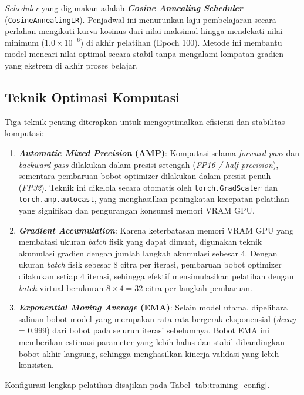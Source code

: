 \documentclass[12pt,a4paper,oneside]{book}
\begin{document}
\textit{Scheduler} yang digunakan adalah \textbf{\textit{Cosine Annealing Scheduler}} (\texttt{CosineAnnealingLR}). Penjadwal ini menurunkan laju pembelajaran secara perlahan mengikuti kurva kosinus dari nilai maksimal hingga mendekati nilai minimum ($1.0 \times 10^{-6}$) di akhir pelatihan (Epoch 100). Metode ini membantu model mencari nilai optimal secara stabil tanpa mengalami lompatan gradien yang ekstrem di akhir proses belajar.

\subsection{Teknik Optimasi Komputasi}

Tiga teknik penting diterapkan untuk mengoptimalkan efisiensi dan stabilitas komputasi:

\begin{enumerate}
  \item \textbf{\textit{Automatic Mixed Precision} (AMP)}: Komputasi selama \textit{forward pass} dan \textit{backward pass} dilakukan dalam presisi setengah (\textit{FP16 / half-precision}), sementara pembaruan bobot optimizer dilakukan dalam presisi penuh (\textit{FP32}). Teknik ini dikelola secara otomatis oleh \texttt{torch.GradScaler} dan \texttt{torch.amp.autocast}, yang menghasilkan peningkatan kecepatan pelatihan yang signifikan dan pengurangan konsumsi memori VRAM GPU.
  \item \textbf{\textit{Gradient Accumulation}}: Karena keterbatasan memori VRAM GPU yang membatasi ukuran \textit{batch} fisik yang dapat dimuat, digunakan teknik akumulasi gradien dengan jumlah langkah akumulasi sebesar 4. Dengan ukuran \textit{batch} fisik sebesar 8 citra per iterasi, pembaruan bobot optimizer dilakukan setiap 4 iterasi, sehingga efektif mensimulasikan pelatihan dengan \textit{batch} virtual berukuran $8 \times 4 = 32$ citra per langkah pembaruan.
  \item \textbf{\textit{Exponential Moving Average} (EMA)}: Selain model utama, dipelihara salinan bobot model yang merupakan rata-rata bergerak eksponensial (\textit{decay} = 0,999) dari bobot pada seluruh iterasi sebelumnya. Bobot EMA ini memberikan estimasi parameter yang lebih halus dan stabil dibandingkan bobot akhir langsung, sehingga menghasilkan kinerja validasi yang lebih konsisten.
\end{enumerate}

Konfigurasi lengkap pelatihan disajikan pada Tabel \ref{tab:training_config}.
\end{document}
